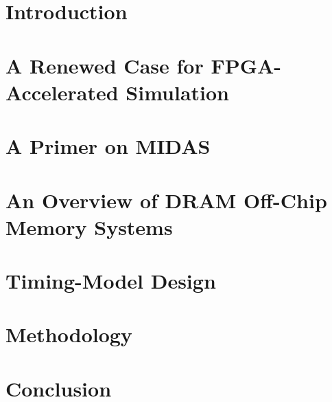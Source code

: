 \documentclass[masters]{ucbthesis}
\begin{document}
\chapter{Introduction}


\chapter{A Renewed Case for FPGA-Accelerated Simulation}


\chapter{A Primer on MIDAS}


\chapter{An Overview of DRAM Off-Chip Memory Systems}


\chapter{Timing-Model Design}


\chapter{Methodology}


%

%

\chapter{Conclusion}


\printbibliography
\end{document}
